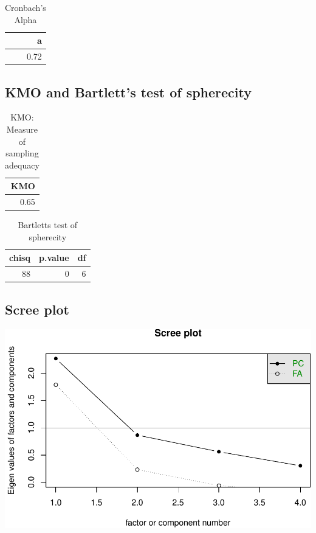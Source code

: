 \documentclass[]{article}
\begin{document}
\begin{table}[H]

\caption{\label{tab:unnamed-chunk-8}Cronbach's Alpha}
\centering
\fontsize{6}{8}\selectfont
\begin{tabular}[t]{r}
\toprule
a\\
\midrule
0.72\\
\bottomrule
\end{tabular}
\end{table}

\hypertarget{kmo-and-bartletts-test-of-spherecity-1}{%
\subsection{KMO and Bartlett's test of
spherecity}\label{kmo-and-bartletts-test-of-spherecity-1}}

\begin{table}[H]

\caption{\label{tab:unnamed-chunk-9}KMO: Measure of sampling adequacy}
\centering
\fontsize{6}{8}\selectfont
\begin{tabular}[t]{r}
\toprule
KMO\\
\midrule
0.65\\
\bottomrule
\end{tabular}
\end{table}

\begin{table}[H]

\caption{\label{tab:unnamed-chunk-9}Bartletts test of spherecity}
\centering
\fontsize{6}{8}\selectfont
\begin{tabular}[t]{rrr}
\toprule
chisq & p.value & df\\
\midrule
88 & 0 & 6\\
\bottomrule
\end{tabular}
\end{table}

\hypertarget{scree-plot-1}{%
\subsection{Scree plot}\label{scree-plot-1}}

\includegraphics{PCA_covid_files/figure-latex/unnamed-chunk-10-1.pdf}
\end{document}
